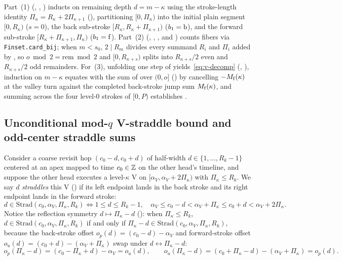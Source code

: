 \begin{outline}
Part~(1) (, , ) inducts on remaining depth
$d = m - \kappa$ using the stroke-length identity $\Pi_\kappa = R_\kappa + 2 \Pi_{\kappa+1}$ (),
partitioning $[0, \Pi_\kappa)$ into the initial plain segment $[0, R_\kappa)$ ($s = 0$), the back sub-stroke $[R_\kappa,
R_\kappa + \Pi_{\kappa+1})$ ($b_1 = \mathrm{b}$), and the forward sub-stroke $[R_\kappa + \Pi_{\kappa+1}, \Pi_\kappa)$
($b_1 = \mathrm{f}$). Part~(2) (, ,
, and ) counts fibers via
\texttt{Finset.card\_bij}; when $m < s_0$, $2 \mid R_m$ divides every summand $R_i$ and $\Pi_i$ added by
, so $o \bmod 2 = \mathrm{rem} \bmod 2$ and $[0, R_{\kappa+s})$ splits into $R_{\kappa+s}/2$ even
and $R_{\kappa+s}/2$ odd remainders. For~(3), unfolding one step of  yields~\eqref{eq:v-decomp}
(, ), induction on $m - \kappa$ equates  with the sum of
 over $(0, o]$ () by cancelling $-M_{\mathrm{f}}(\kappa)$ at the valley
turn against the completed back-stroke jump sum $M_{\mathrm{f}}(\kappa)$, and summing across the four level-$0$ strokes of
$[0, P)$ establishes .
\end{outline}

\subsection{Unconditional mod-\texorpdfstring{$q$}{q} V-straddle bound and odd-center straddle sums}\label{sec:dnp-straddle}

Consider a coarse revisit hop $(c_0 - d, c_0 + d)$ of half-width $d \in \{1, \dots, R_k - 1\}$ centered at an apex mapped
to time $c_0 \in \mathbb{Z}$ on the other head's timeline, and suppose the other head executes a level-$\kappa$ V on $[\alpha_V,
\alpha_V + 2\Pi_\kappa)$ with $\Pi_\kappa \le R_k$. We say $d$ \emph{straddles} this V () if its left
endpoint lands in the back stroke and its right endpoint lands in the forward stroke:
\begin{equation}\label{eq:straddle-set}
  d \in \mathrm{Strad}(c_0, \alpha_V, \Pi_\kappa, R_k) \iff
  1 \le d \le R_k - 1,\quad \alpha_V \le c_0 - d < \alpha_V + \Pi_\kappa \le c_0 + d < \alpha_V + 2\Pi_\kappa.
\end{equation}
Notice the reflection symmetry $d \mapsto \Pi_\kappa - d$ (): when $\Pi_\kappa \le R_k$,
$d \in \mathrm{Strad}(c_0, \alpha_V, \Pi_\kappa, R_k)$ if and only if $\Pi_\kappa - d \in \mathrm{Strad}(c_0, \alpha_V,
\Pi_\kappa, R_k)$, because the back-stroke offset $o_p(d) = (c_0 - d) - \alpha_V$ and forward-stroke offset $o_u(d) =
(c_0 + d) - (\alpha_V + \Pi_\kappa)$ swap under $d \leftrightarrow \Pi_\kappa - d$:
\[
  o_p(\Pi_\kappa - d) = (c_0 - \Pi_\kappa + d) - \alpha_V = o_u(d), \qquad
  o_u(\Pi_\kappa - d) = (c_0 + \Pi_\kappa - d) - (\alpha_V + \Pi_\kappa) = o_p(d).
\]

